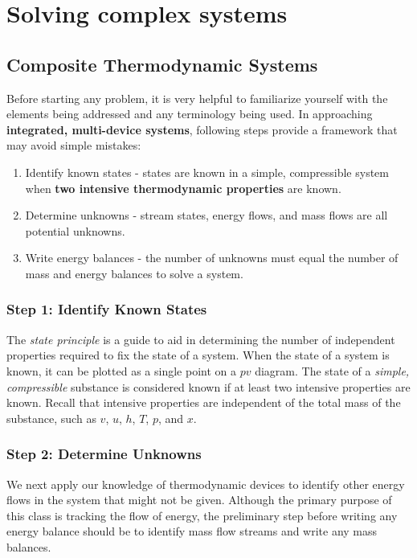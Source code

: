 \documentclass{article}
\begin{document}
\section{Solving complex systems}
\subsection{Composite Thermodynamic Systems}
Before starting any problem, it is very helpful to familiarize yourself with the elements being addressed and any terminology being used. In approaching \textbf{integrated, multi-device systems}, following steps provide a framework that may avoid simple mistakes:
\begin{enumerate}
\item Identify known states - states are known in a simple, compressible system when \textbf{two intensive thermodynamic properties} are known.
\item Determine unknowns - stream states, energy flows, and mass flows are all potential unknowns.
\item Write energy balances - the number of unknowns must equal the number of mass and energy balances to solve a system.
\end{enumerate}

\subsubsection{Step 1: Identify Known States}

The \emph{state principle} is a guide to aid in determining the number of independent properties required to fix the state of a system. When the state of a system is known, it can be plotted as a single point on a $pv$ diagram. The state of a \emph{simple, compressible} substance is considered known if at least two intensive properties are known. Recall that intensive properties are independent of the total mass of the substance, such as $v$, $u$, $h$, $T$, $p$, and $x$.

\subsubsection{Step 2: Determine Unknowns}

We next apply our knowledge of thermodynamic devices to identify other energy flows in the system that might not be given.  Although the primary purpose of this class is tracking the flow of energy, the preliminary step before writing any energy balance should be to identify mass flow streams and write any mass balances. 
\end{document}
